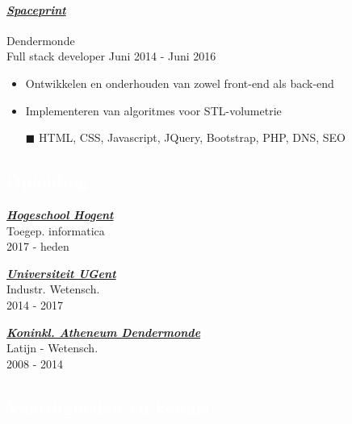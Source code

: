 \documentclass[a4paper, twoside]{article}
\begin{document}
\paragraph{\textbf{\textit{\href{https:// }{\textcolor{blueDark}{ Spaceprint }}}}} \hfill\small Dendermonde \\
Full stack developer \hfill\small
Juni 2014
- Juni 2016
\begin{itemize}
\itemsep-0.2em
\item Ontwikkelen en onderhouden van zowel front-end als back-end
\item Implementeren van algoritmes voor STL-volumetrie
\item[\color{orange}$\blacksquare$] HTML, CSS, Javascript, JQuery, Bootstrap, PHP, DNS, SEO
\end{itemize}
\begin{mdframed}
\section*{\textcolor{white}{ Opleiding }}
\end{mdframed}
\begin{multicols}{ 3 }
\setlength{\parindent}{0pt}
\par
\textbf{\textit{\href{https://hogent.be }{\textcolor{blueDark}{ Hogeschool Hogent }}}}\\
Toegep. informatica\\ \small 2017 - heden
\setlength{\parindent}{0pt}
\par
\textbf{\textit{\href{https://ugent.be }{\textcolor{blueDark}{ Universiteit UGent }}}}\\
Industr. Wetensch.\\ \small 2014 - 2017
\setlength{\parindent}{0pt}
\par
\textbf{\textit{\href{https://kad.be }{\textcolor{blueDark}{ Koninkl. Atheneum Dendermonde }}}}\\
Latijn - Wetensch.\\ \small 2008 - 2014
\end{multicols}
\begin{mdframed}
\section*{\textcolor{white}{ Vaardigheden en kennis }}
\end{mdframed}
\noindent
\end{document}
